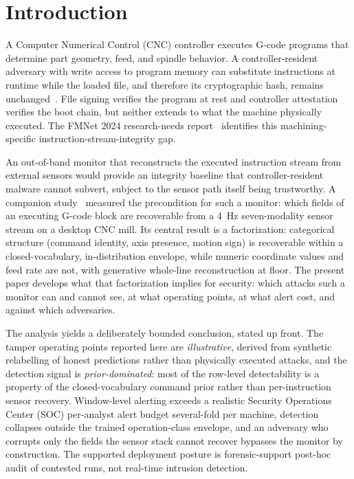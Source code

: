 \documentclass[sensors,article,submit,moreauthors,pdftex]{Definitions/mdpi}
\begin{document}
\section{Introduction}
\label{sec:introduction}

A Computer Numerical Control (CNC) controller executes G-code programs that determine part geometry, feed, and spindle behavior. A controller-resident adversary with write access to program memory can substitute instructions at runtime while the loaded file, and therefore its cryptographic hash, remains unchanged~\cite{sturm2014cyber,yampolskiy2018security,kimmell2025cnc}. File signing verifies the program at rest and controller attestation verifies the boot chain, but neither extends to what the machine physically executed. The FMNet 2024 research-needs report~\cite{nist2024fmnet} identifies this machining-specific instruction-stream-integrity gap.

An out-of-band monitor that reconstructs the executed instruction stream from external sensors would provide an integrity baseline that controller-resident malware cannot subvert, subject to the sensor path itself being trustworthy. A companion study~\cite{decoder_paper} measured the precondition for such a monitor: which fields of an executing G-code block are recoverable from a 4~Hz seven-modality sensor stream on a desktop CNC mill. Its central result is a factorization: categorical structure (command identity, axis presence, motion sign) is recoverable within a closed-vocabulary, in-distribution envelope, while numeric coordinate values and feed rate are not, with generative whole-line reconstruction at floor. The present paper develops what that factorization implies for security: which attacks such a monitor can and cannot see, at what operating points, at what alert cost, and against which adversaries.

The analysis yields a deliberately bounded conclusion, stated up front. The tamper operating points reported here are \emph{illustrative}, derived from synthetic relabelling of honest predictions rather than physically executed attacks, and the detection signal is \emph{prior-dominated}: most of the row-level detectability is a property of the closed-vocabulary command prior rather than per-instruction sensor recovery. Window-level alerting exceeds a realistic Security Operations Center (SOC) per-analyst alert budget several-fold per machine, detection collapses outside the trained operation-class envelope, and an adversary who corrupts only the fields the sensor stack cannot recover bypasses the monitor by construction. The supported deployment posture is forensic-support post-hoc audit of contested runs, not real-time intrusion detection.
\end{document}

